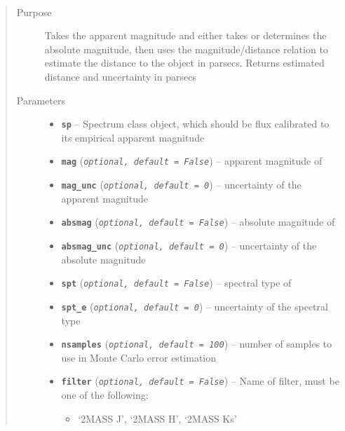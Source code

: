 \documentclass[letterpaper,10pt,english]{sphinxmanual}
\begin{document}
\begin{fulllineitems}
\label{api:splat.estimateDistance}~\begin{quote}\begin{description}
\item[{Purpose}] \leavevmode
Takes the apparent magnitude and either takes or determines the absolute
magnitude, then uses the magnitude/distance relation to estimate the
distance to the object in parsecs. Returns estimated distance and
uncertainty in parsecs

\item[{Parameters}] \leavevmode\begin{itemize}
\item {} 
\textbf{\texttt{sp}} -- Spectrum class object, which should be flux calibrated to its empirical apparent magnitude

\item {} 
\textbf{\texttt{mag}} (\emph{\texttt{optional, default = False}}) -- apparent magnitude of 

\item {} 
\textbf{\texttt{mag\_unc}} (\emph{\texttt{optional, default = 0}}) -- uncertainty of the apparent magnitude

\item {} 
\textbf{\texttt{absmag}} (\emph{\texttt{optional, default = False}}) -- absolute magnitude of 

\item {} 
\textbf{\texttt{absmag\_unc}} (\emph{\texttt{optional, default = 0}}) -- uncertainty of the absolute magnitude

\item {} 
\textbf{\texttt{spt}} (\emph{\texttt{optional, default = False}}) -- spectral type of 

\item {} 
\textbf{\texttt{spt\_e}} (\emph{\texttt{optional, default = 0}}) -- uncertainty of the spectral type

\item {} 
\textbf{\texttt{nsamples}} (\emph{\texttt{optional, default = 100}}) -- number of samples to use in Monte Carlo error estimation

\item {} 
\textbf{\texttt{filter}} (\emph{\texttt{optional, default = False}}) -- 
Name of filter, must be one of the following:
\begin{itemize}
\item {} 
`2MASS J', `2MASS H', `2MASS Ks'


\end{itemize}
\end{itemize}
\end{description}
\end{quote}
\end{fulllineitems}
\end{document}
